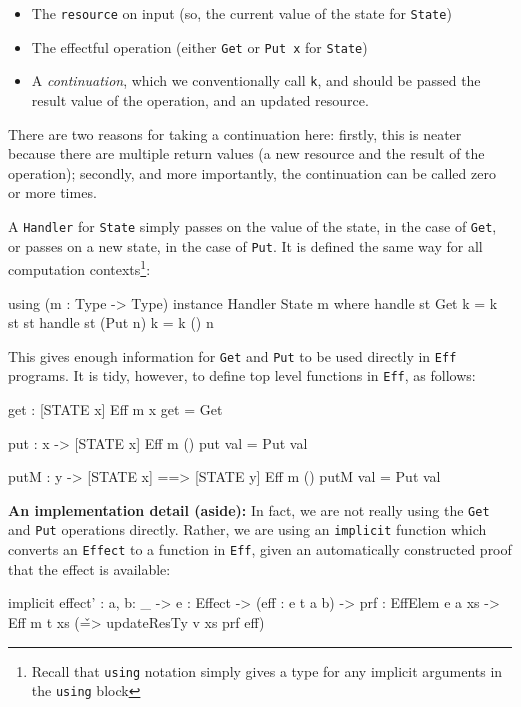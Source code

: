 \begin{itemize}
\item The \texttt{resource} on input (so, the current value of the state for
\texttt{State})
\item The effectful operation (either \texttt{Get} or \texttt{Put x} for
\texttt{State})
\item A \emph{continuation}, which we conventionally call \texttt{k},
and should be passed the result value of the
operation, and an updated resource.
\end{itemize}

\noindent
There are two reasons for taking a continuation here: firstly, this is neater
because there are multiple return values (a new resource and the result of
the operation); secondly, and more importantly, the continuation can be called
zero or more times.

A \texttt{Handler} for \texttt{State} simply passes on the value of the state,
in the case of \texttt{Get}, or passes on a new state, in the case of \texttt{Put}.
It is defined the same way for all computation contexts\footnote{Recall that
\texttt{using} notation simply gives a type for any implicit arguments in
the \texttt{using} block}:

\begin{code}
using (m : Type -> Type)
  instance Handler State m where
     handle st Get     k = k st st
     handle st (Put n) k = k () n
\end{code}

\noindent
This gives enough information for \texttt{Get} and \texttt{Put} to be used
directly in \texttt{Eff} programs. It is tidy, however, to define top level
functions in \texttt{Eff}, as follows:

\begin{code}
get : { [STATE x] } Eff m x
get = Get

put : x -> { [STATE x] } Eff m () 
put val = Put val

putM : y -> { [STATE x] ==> [STATE y] } Eff m () 
putM val = Put val
\end{code}

\noindent
\textbf{An implementation detail (aside):} In fact, we are not really using
the \texttt{Get} and \texttt{Put} operations directly. Rather, we are using
an \texttt{implicit} function which converts an \texttt{Effect} to a 
function in \texttt{Eff}, given an automatically constructed proof that the
effect is available:

\begin{code}
implicit
effect' : {a, b: _} -> {e : Effect} ->
          (eff : e t a b) ->
          {prf : EffElem e a xs} ->
          Eff m t xs (\v => updateResTy v xs prf eff)
\end{code}

